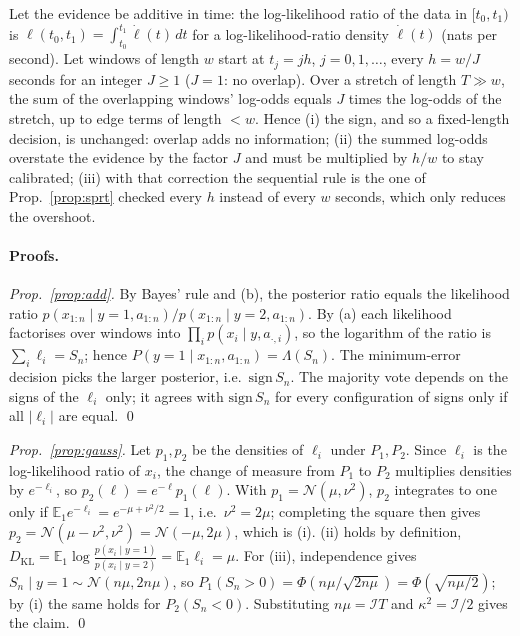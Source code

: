 \begin{proposition}\label{prop:overlap}
Let the evidence be additive in time: the log-likelihood ratio of the data in
$[t_0,t_1)$ is $\ell(t_0,t_1)=\int_{t_0}^{t_1}\dot\ell(t)\,dt$ for a log-likelihood-ratio density
$\dot\ell(t)$ (nats per second). Let windows of length $w$ start at $t_j=jh$, $j=0,1,\dots$,
every $h=w/J$ seconds for an integer $J\ge1$ ($J=1$: no overlap). Over a stretch of length $T\gg w$, the sum of the
overlapping windows' log-odds equals $J$ times the log-odds of the stretch, up to edge terms
of length $<w$. Hence (i) the sign, and so a fixed-length decision, is unchanged: overlap adds
no information; (ii) the summed log-odds overstate the evidence by the factor $J$ and must be
multiplied by $h/w$ to stay calibrated; (iii) with that correction the sequential rule is the
one of Prop.~\ref{prop:sprt} checked every $h$ instead of every $w$ seconds, which only
reduces the overshoot.
\end{proposition}

\paragraph{Proofs.}
\emph{Prop.~\ref{prop:add}.} By Bayes' rule and (b), the posterior ratio equals the likelihood
ratio $p(x_{1:n}\mid y{=}1,a_{1:n})/p(x_{1:n}\mid y{=}2,a_{1:n})$. By (a) each likelihood
factorises over windows into $\prod_i p(x_i\mid y,a_{\cdot,i})$, so the logarithm of the ratio
is $\sum_i\ell_i=S_n$; hence $P(y{=}1\mid x_{1:n},a_{1:n})=\Lambda(S_n)$. The minimum-error
decision picks the larger posterior, i.e.\ $\mathrm{sign}\,S_n$. The majority vote depends on
the signs of the $\ell_i$ only; it agrees with $\mathrm{sign}\,S_n$ for every configuration of
signs only if all $|\ell_i|$ are equal. \qed

\emph{Prop.~\ref{prop:gauss}.} Let $p_1,p_2$ be the densities of $\ell_i$ under $P_1,P_2$.
Since $\ell_i$ is the log-likelihood ratio of $x_i$, the change of measure from $P_1$ to $P_2$
multiplies densities by $e^{-\ell_i}$, so $p_2(\ell)=e^{-\ell}p_1(\ell)$. With
$p_1=\mathcal N(\mu,\nu^2)$, $p_2$ integrates to one only if
$\mathbb E_1 e^{-\ell_i}=e^{-\mu+\nu^2/2}=1$, i.e.\ $\nu^2=2\mu$; completing the square then
gives $p_2=\mathcal N(\mu-\nu^2,\nu^2)=\mathcal N(-\mu,2\mu)$, which is (i). (ii) holds by
definition, $D_{\mathrm{KL}}=\mathbb E_1\log\frac{p(x_i\mid y=1)}{p(x_i\mid y=2)}
=\mathbb E_1\ell_i=\mu$. For (iii), independence gives $S_n\mid y{=}1\sim\mathcal N(n\mu,2n\mu)$,
so $P_1(S_n>0)=\Phi(n\mu/\sqrt{2n\mu})=\Phi(\sqrt{n\mu/2})$; by (i) the same holds for
$P_2(S_n<0)$. Substituting $n\mu=\mathcal I T$ and $\kappa^2=\mathcal I/2$ gives the claim. \qed

